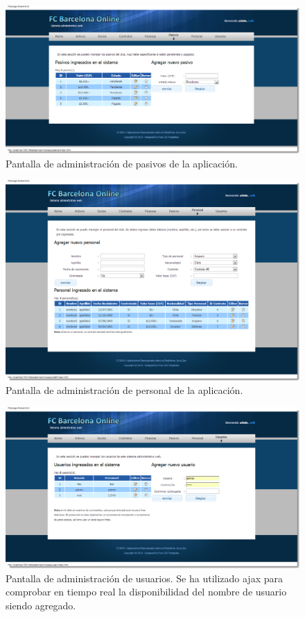 \documentclass[letter]{article}
\begin{document}
\begin{figure}
\centering
  \includegraphics[width=\textwidth]{figs/fig8.png}
  \caption{Pantalla de administración de pasivos de la aplicación.}
\end{figure}

\begin{figure}
\centering
  \includegraphics[width=\textwidth]{figs/fig9.png}
  \caption{Pantalla de administración de personal de la aplicación.}
\end{figure}

\begin{figure}
\centering
  \includegraphics[width=\textwidth]{figs/fig10.png}
  \caption{Pantalla de administración de usuarios. Se ha utilizado ajax para comprobar en tiempo real la disponibilidad del nombre de usuario siendo agregado.}
\end{figure}
\end{document}
